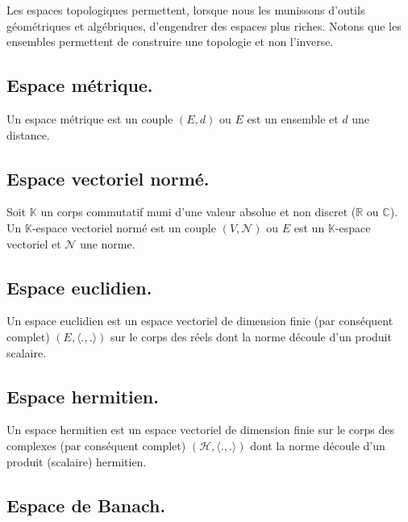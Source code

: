 \noindent Les espaces topologiques permettent, lorsque nous les munissons d'outils géométriques et algébriques, d'engendrer des espaces plus riches. Notons que les ensembles permettent de construire une topologie et non l'inverse. \newline

\subsection{Espace métrique.} 

\noindent Un espace métrique est un couple $(E, d)$ ou $E$ est un ensemble et $d$ une distance. \newline

\subsection{Espace vectoriel normé.} 

\noindent Soit $\mathbb{K}$ un corps commutatif muni d'une valeur absolue et non discret ($\mathbb{R}$ ou $\mathbb{C}$). Un $\mathbb{K}$-espace vectoriel normé est un couple $(V,\mathcal{N})$ ou $E$ est un $\mathbb{K}$-espace vectoriel et $\mathcal{N}$ une norme. \newline

\subsection{Espace euclidien.} 

\noindent Un espace euclidien est un espace vectoriel de dimension finie (par conséquent complet) $(E, \langle ., . \rangle)$ sur le corps des réels dont la norme découle d'un produit scalaire. \newline

\subsection{Espace hermitien.}

\noindent Un espace hermitien est un espace vectoriel de dimension finie sur le corps des complexes (par conséquent complet) $(\mathcal{H}, \langle . , . \rangle)$ dont la norme découle d'un produit (scalaire) hermitien. \newline


\subsection{Espace de Banach.}

